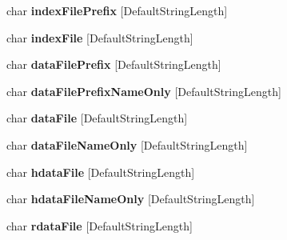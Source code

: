 \begin{DoxyCompactItemize}
\item 
\hypertarget{structparamStruct_a7e663acbf7c1c5ebf9a063a28f094130}{char {\bfseries index\-File\-Prefix} \mbox{[}Default\-String\-Length\mbox{]}}\label{structparamStruct_a7e663acbf7c1c5ebf9a063a28f094130}

\item 
\hypertarget{structparamStruct_a5fbdbd413a2ed57c8347723f138bde9a}{char {\bfseries index\-File} \mbox{[}Default\-String\-Length\mbox{]}}\label{structparamStruct_a5fbdbd413a2ed57c8347723f138bde9a}

\item 
\hypertarget{structparamStruct_a12612ecb8d10cfda2fd19de0e58a0c4d}{char {\bfseries data\-File\-Prefix} \mbox{[}Default\-String\-Length\mbox{]}}\label{structparamStruct_a12612ecb8d10cfda2fd19de0e58a0c4d}

\item 
\hypertarget{structparamStruct_a3d2d3d96ce0de18c545294716f421c56}{char {\bfseries data\-File\-Prefix\-Name\-Only} \mbox{[}Default\-String\-Length\mbox{]}}\label{structparamStruct_a3d2d3d96ce0de18c545294716f421c56}

\item 
\hypertarget{structparamStruct_adb0e47a17c3d0833a7fcd5ecb9954e52}{char {\bfseries data\-File} \mbox{[}Default\-String\-Length\mbox{]}}\label{structparamStruct_adb0e47a17c3d0833a7fcd5ecb9954e52}

\item 
\hypertarget{structparamStruct_a6a562d4c0b74413ebd8acfa896ddce68}{char {\bfseries data\-File\-Name\-Only} \mbox{[}Default\-String\-Length\mbox{]}}\label{structparamStruct_a6a562d4c0b74413ebd8acfa896ddce68}

\item 
\hypertarget{structparamStruct_af60c9d803bec25e825f6161f06c2354d}{char {\bfseries hdata\-File} \mbox{[}Default\-String\-Length\mbox{]}}\label{structparamStruct_af60c9d803bec25e825f6161f06c2354d}

\item 
\hypertarget{structparamStruct_a17926e907c651e7d894b253f782d57e5}{char {\bfseries hdata\-File\-Name\-Only} \mbox{[}Default\-String\-Length\mbox{]}}\label{structparamStruct_a17926e907c651e7d894b253f782d57e5}

\item 
\hypertarget{structparamStruct_ab47ec41ff1d1875d27af6b891cfbb5ec}{char {\bfseries rdata\-File} \mbox{[}Default\-String\-Length\mbox{]}}\label{structparamStruct_ab47ec41ff1d1875d27af6b891cfbb5ec}


\end{DoxyCompactItemize}
